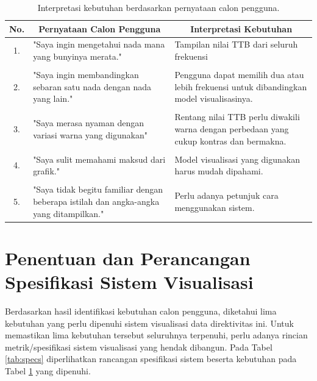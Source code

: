 \begin{table}[b!]
	\centering
	\caption{Interpretasi kebutuhan berdasarkan pernyataan calon pengguna.}
	\begin{tabular}{c p{6cm} p{6cm}}
		\hline
		\textbf{No.} & \multicolumn{1}{c}{\textbf{Pernyataan Calon Pengguna}} & \multicolumn{1}{c}{\textbf{Interpretasi Kebutuhan}} \\
		\hline
		1. & "Saya ingin mengetahui nada mana yang bunyinya merata." & Tampilan nilai TTB dari seluruh frekuensi \\
		\\
		2. & "Saya ingin membandingkan sebaran satu nada dengan nada yang lain." & Pengguna dapat memilih dua atau lebih frekuensi untuk dibandingkan model visualisasinya. \\
		\\
		3. & "Saya merasa nyaman dengan variasi warna yang digunakan" & Rentang nilai TTB perlu diwakili warna dengan perbedaan yang cukup kontras dan bermakna. \\
		\\
		4. & "Saya sulit memahami maksud dari grafik." & Model visualisasi yang digunakan harus mudah dipahami. \\
		\\
		5. & "Saya tidak begitu familiar dengan beberapa istilah dan angka-angka yang ditampilkan." & Perlu adanya petunjuk cara menggunakan sistem. \\
		\hline
	\end{tabular}
	\label{tab:user-needs}
\end{table}


\section{Penentuan dan Perancangan Spesifikasi Sistem Visualisasi}
Berdasarkan hasil identifikasi kebutuhan calon pengguna, diketahui lima kebutuhan yang perlu dipenuhi sistem visualisasi data direktivitas \bundengan ini. Untuk memastikan lima kebutuhan tersebut seluruhnya terpenuhi, perlu adanya rincian metrik/spesifikasi sistem visualisasi yang hendak dibangun. Pada Tabel \ref{tab:specs} diperlihatkan rancangan spesifikasi sistem beserta kebutuhan pada Tabel \ref{tab:user-needs} yang dipenuhi. \par 

